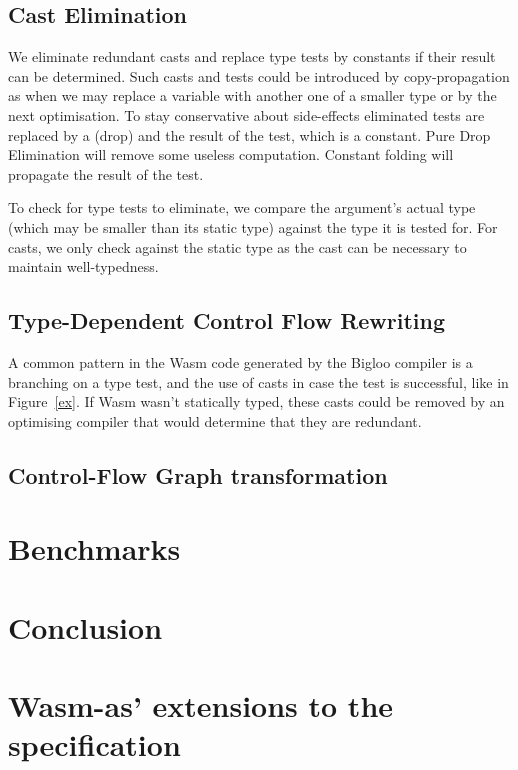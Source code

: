 \documentclass[a4paper,11pt]{article}
\begin{document}
\subsection{Cast Elimination}
We eliminate redundant casts and replace type tests by constants if their result
can be determined. Such casts and tests could be introduced by copy-propagation
as when we may replace a variable with another one of a smaller type or by the
next optimisation. To stay conservative about side-effects eliminated tests are
replaced by a \textsf{(drop)} and the result of the test, which is a constant.
Pure Drop Elimination will remove some useless computation. Constant folding
will propagate the result of the test.

To check for type tests to eliminate, we compare the argument's actual type
(which may be smaller than its static type) against the type it is tested for.
For casts, we only check against the static type as the cast can be necessary to
maintain well-typedness.

\subsection{Type-Dependent Control Flow Rewriting}\label{broncast}
A common pattern in the Wasm code generated by the Bigloo compiler is a
branching on a type test, and the use of casts in case the test is successful,
like in Figure~\ref{ex}. If Wasm wasn't statically typed, these casts could be
removed by an optimising compiler that would determine that they are redundant.

\subsection{Control-Flow Graph transformation}
\section{Benchmarks}\label{bench}
\section{Conclusion}
\printbibliography
\newpage
\appendix
\section{Wasm-as' extensions to the specification}\label{wasmasex}
\end{document}
